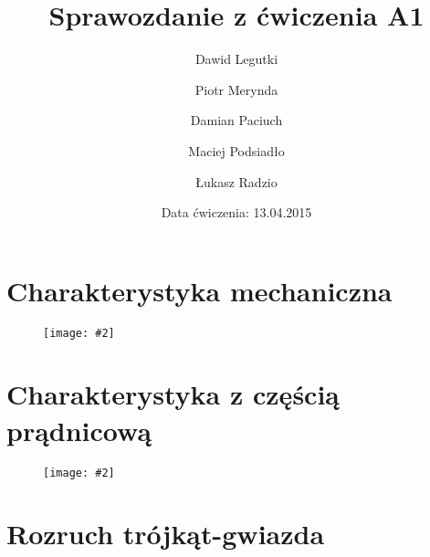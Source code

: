 \documentclass[12pt]{article}
\title{Sprawozdanie z ćwiczenia A1}
\author{ 
Dawid Legutki \and Piotr Merynda \and Damian Paciuch \and Maciej Podsiadło \and Łukasz Radzio}
\date{Data ćwiczenia: 13.04.2015}
\newcommand{\obrazek}[2]
{
	\begin{figure}[H]
	\centering
	\texttt{[image: \#2]}
	\end{figure}
}
\begin{document}
\maketitle

\section{Charakterystyka mechaniczna}

\obrazek{12}{Wykresy/Mechaniczna}


\section{Charakterystyka z częścią prądnicową}
\obrazek{12}{Wykresy/Kloss}



\section{Rozruch trójkąt-gwiazda}
\end{document}
